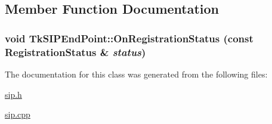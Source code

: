 \subsection{Member Function Documentation}
\hypertarget{classTkSIPEndPoint_5b93673682f870ade1599d812ef87717}{
\subsubsection[{OnRegistrationStatus}]{\setlength{\rightskip}{0pt plus 5cm}void TkSIPEndPoint::OnRegistrationStatus (const RegistrationStatus \& {\em status})}}
\label{classTkSIPEndPoint_5b93673682f870ade1599d812ef87717}




The documentation for this class was generated from the following files:\begin{CompactItemize}
\item 
\hyperlink{sip_8h}{sip.h}\item 
\hyperlink{sip_8cpp}{sip.cpp}\end{CompactItemize}

